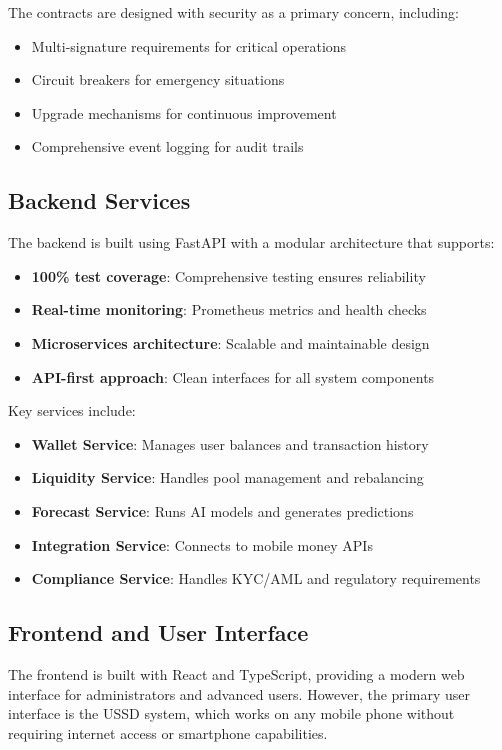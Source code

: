 \documentclass[11pt,a4paper]{article}
\begin{document}
The contracts are designed with security as a primary concern, including:
\begin{itemize}
    \item Multi-signature requirements for critical operations
    \item Circuit breakers for emergency situations
    \item Upgrade mechanisms for continuous improvement
    \item Comprehensive event logging for audit trails
\end{itemize}

\subsection{Backend Services}

The backend is built using FastAPI with a modular architecture that supports:

\begin{itemize}
    \item \textbf{100\% test coverage}: Comprehensive testing ensures reliability
    \item \textbf{Real-time monitoring}: Prometheus metrics and health checks
    \item \textbf{Microservices architecture}: Scalable and maintainable design
    \item \textbf{API-first approach}: Clean interfaces for all system components
\end{itemize}

Key services include:
\begin{itemize}
    \item \textbf{Wallet Service}: Manages user balances and transaction history
    \item \textbf{Liquidity Service}: Handles pool management and rebalancing
    \item \textbf{Forecast Service}: Runs AI models and generates predictions
    \item \textbf{Integration Service}: Connects to mobile money APIs
    \item \textbf{Compliance Service}: Handles KYC/AML and regulatory requirements
\end{itemize}

\subsection{Frontend and User Interface}

The frontend is built with React and TypeScript, providing a modern web interface for administrators and advanced users. However, the primary user interface is the USSD system, which works on any mobile phone without requiring internet access or smartphone capabilities.
\end{document}
